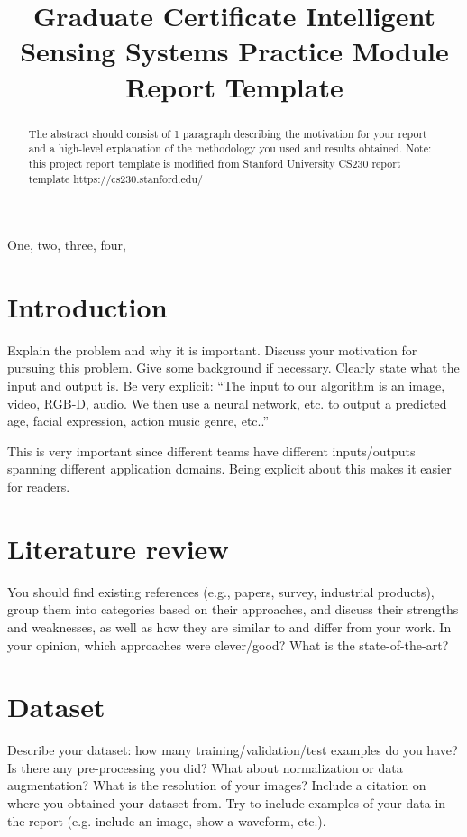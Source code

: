 \documentclass{article}
\title{Graduate Certificate Intelligent Sensing Systems Practice Module Report Template}
\begin{document}
%
\maketitle
%

\begin{abstract}

The abstract should consist of 1 paragraph describing the motivation for your report and a high-level explanation of the methodology you used and results obtained. Note: this project report template is modified from Stanford University CS230 report template https://cs230.stanford.edu/

\end{abstract}
%

\begin{keywords}
One, two, three, four,
\end{keywords}
%
\section{Introduction}
\label{sec:intro}

Explain the problem and why it is important. Discuss your motivation for pursuing this
problem. Give some background if necessary. Clearly state what the input and output
is. Be very explicit: “The input to our algorithm is an {image, video, RGB-D, audio}. We then use a {neural network, etc.} to output a predicted {age, facial expression, action music genre, etc.}.”

This is very important since different teams have different inputs/outputs spanning different
application domains. Being explicit about this makes it easier for readers.


\section{Literature review}
You should find existing references (e.g., papers, survey, industrial products), group them into categories based on their approaches, and discuss their strengths and weaknesses, as well as how they are similar to and differ from your work. In your opinion, which approaches were clever/good? What is the state-of-the-art?

\section{Dataset}
Describe your dataset: how many training/validation/test examples do you have? Is there
any pre-processing you did? What about normalization or data augmentation? What is the
resolution of your images? Include a citation on where you obtained your dataset from. Try to include examples of your data in the report (e.g. include an image, show a waveform, etc.).
\end{document}
